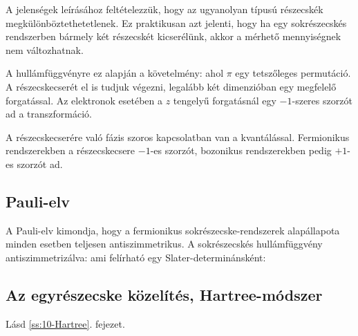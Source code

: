    A jelenségek leírásához feltételezzük, hogy az ugyanolyan típusú részecskék megkülönböztethetetlenek.
   Ez praktikusan azt jelenti, hogy ha egy sokrészecskés rendszerben bármely két részecskét kicserélünk, akkor a mérhető mennyiségnek nem változhatnak. 
   
   A hullámfüggvényre ez alapján a követelmény:
   ahol $\pi$ egy tetszőleges permutáció.
   A részecskecserét el is tudjuk végezni, legalább két dimenzióban egy megfelelő forgatással.
   Az elektronok esetében a $z$ tengelyű forgatásnál egy $-1$-szeres szorzót ad a transzformáció. 
   
   A részecskecserére való fázis szoros kapcsolatban van a kvantálással.
   Fermionikus rendszerekben a részecskecsere $-1$-es szorzót, bozonikus rendszerekben pedig $+1$-es szorzót ad.
   
  \subsection{Pauli-elv}
   
   A Pauli-elv kimondja, hogy a fermionikus sokrészecske-rendszerek alapállapota minden esetben teljesen antiszimmetrikus.
   A sokrészecskés hullámfüggvény antiszimmetrizálva:
   ami felírható egy Slater-determinánsként:
   
  \subsection{Az egyrészecske közelítés, Hartree-módszer}
   
   Lásd \ref{ss:10-Hartree}. fejezet. 
